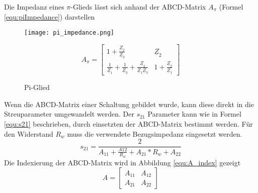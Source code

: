 Die Impedanz eines  $\pi$-Glieds lässt sich anhand der ABCD-Matrix $A_\pi$ (Formel \ref{equ:piImpedance}) darstellen
\begin{figure}[H]
	\begin{minipage}[h]{0.45\linewidth}
		\centering
		\texttt{[image: pi\_impedance.png]}
		\label{fig:piImpedance}
		\caption{Pi-Glied \cite{2torTabelle}}
	\end{minipage}
	\begin{minipage}[h]{0.45\linewidth}
		\begin{equation}\label{equ:piImpedance}
			A_\pi = \left[\begin{matrix}
			1+\frac{\underline{Z}_2}{\underline{Z}_3}&\underline{Z}_2\\
			\frac{1}{\underline{Z}_1}+\frac{1}{\underline{Z}_3}+\frac{\underline{Z}_2}{\underline{Z}_1\underline{Z}_3}&1+\frac{\underline{Z}_2}				{\underline{Z}_1}
			\end{matrix}\right]
		\end{equation}
	\end{minipage}
\end{figure}

Wenn die ABCD-Matrix einer Schaltung gebildet wurde, kann diese direkt in die Streuparameter umgewandelt werden. Der $s_{21}$ Parameter kann wie in Formel \ref{equ:s21} beschrieben, durch einsetzten der ABCD-Matrix bestimmt werden. Für den Widerstand $R_w$ muss die verwendete Bezugsimpedanz eingesetzt werden.
\begin{equation}\label{equ:s21}
s_{21} = \frac{2}{A_{11}+\frac{A{12}}{R_w}+A_{21}*R_w+A_{22}}
\end{equation}
Die Indexierung der ABCD-Matrix wird in Abbildung \ref{equ:A_index} gezeigt
\begin{equation}\label{equ:A_index}
	A = \left[\begin{matrix}
	A_{11}&A_{12}\\A_{21}&A_{22}
	\end{matrix}\right]
\end{equation}
\newpage

